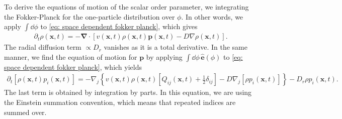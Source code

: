 To derive the equations of motion of the scalar order parameter, we integrating the Fokker-Planck for the one-particle distribution over $\phi$.
In other words, we apply $\int \dd \phi$ to \autoref{eq: space dependent fokker planck}, which gives
%
\begin{align}\label{eq: density FP}
    \partial_t \rho(\bm x, t)
    = 
    - \bm \nabla \cdot [ v(\bm x, t) \rho(\bm x, t) \bm p(\bm x, t) - D \nabla \rho(\bm x, t)].
\end{align}
%
The radial diffusion term $\propto D_r$ vanishes as it is a total derivative.
In the same manner, we find the equation of motion for $\bm p$ by applying $\int \dd\phi \, \hat{\bm e}(\phi)$ to \autoref{eq: space dependent fokker planck}, which yields
%
\begin{align} \label{eq: polarity FP}
    \partial_t [\rho(\bm x, t)  p_i(\bm x, t)]
    =
    -
    \nabla_{j}
    \left\{
        v(\bm x, t) \rho(\bm x, t) \left[ Q_{ij}(\bm x, t) + \frac{ 1 }{ 2 }  \delta_{ij}\right]
        - D \nabla_j [\rho p_i(\bm x, t)]
    \right\}
    - D_r \rho p_i(\bm x, t).
\end{align}
%
The last term is obtained by integration by parts.
In this equation, we are using the Einstein summation convention, which means that repeated indices are summed over.

